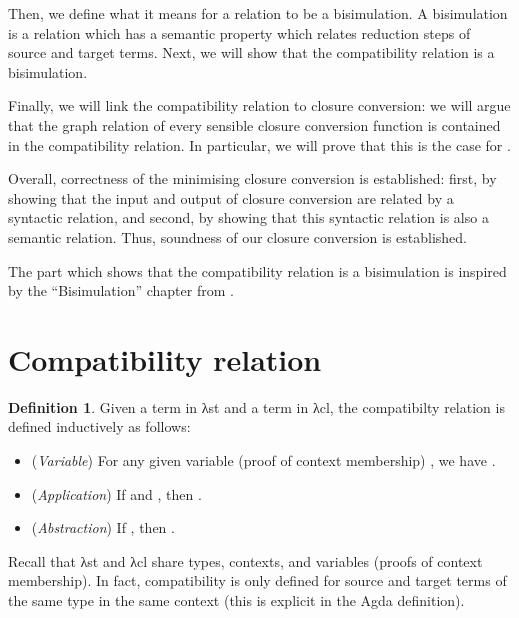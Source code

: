 \documentclass[bsc,frontabs,oneside,singlespacing,parskip,deptreport]{infthesis}
\theoremstyle{definition}
\newtheorem*{definition}{Definition}
\theoremstyle{lemma}
\begin{document}
Then, we define what it means for a relation to be a bisimulation. A
bisimulation is a relation which has a semantic property which relates
reduction steps of source and target terms. Next, we will show that
the compatibility relation is a bisimulation.

Finally, we will link the compatibility relation to closure
conversion: we will argue that the graph relation of every sensible
closure conversion function is contained in the compatibility
relation. In particular, we will prove that this is the case for
.

Overall, correctness of the minimising closure conversion is
established: first, by showing that the input and output of closure
conversion are related by a syntactic relation, and second, by showing
that this syntactic relation is also a semantic relation. Thus,
soundness of our closure conversion is established.

The part which shows that the compatibility relation is a bisimulation
is inspired by the ``Bisimulation'' chapter from
\cite{DBLP:conf/sbmf/Wadler18}. 

\section{Compatibility relation}
\label{sec:comp-rel}

\begin{definition}
  Given a term  in λst and a term  in λcl,
  the compatibilty relation  is defined inductively as
  follows:

  \begin{itemize}
  \item (\textit{Variable}) For any given variable (proof of context
    membership) , we have .

  \item (\textit{Application}) If  and ,
    then .

  \item (\textit{Abstraction}) If , then
    .
    
  \end{itemize}
\end{definition}

Recall that λst and λcl share types, contexts, and variables (proofs
of context membership). In fact, compatibility is only defined for source
and target terms of the same type in the same context (this is
explicit in the Agda definition).
\end{document}
